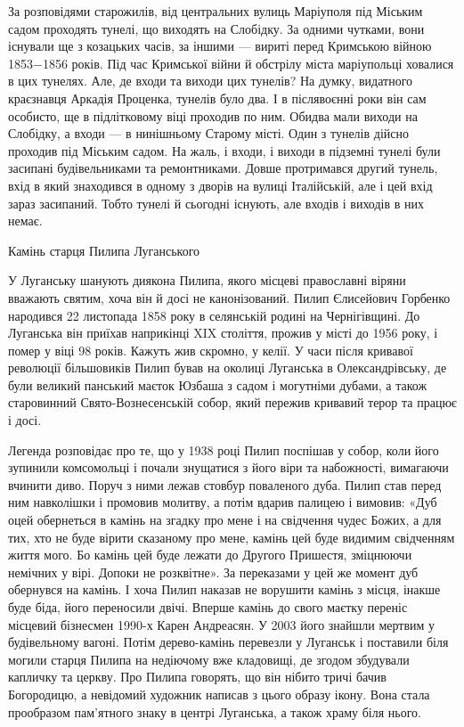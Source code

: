 За розповідями старожилів, від центральних вулиць Маріуполя під Міським садом
проходять тунелі, що виходять на Слобідку. За одними чутками, вони існували ще
з козацьких часів, за іншими — вириті перед Кримською війною 1853−1856 років.
Під час Кримської війни й обстрілу міста маріупольці ховалися в цих тунелях.
Але, де входи та виходи цих тунелів? На думку, видатного краєзнавця Аркадія
Проценка, тунелів було два. І в післявоєнні роки він сам особисто, ще в
підлітковому віці проходив по ним. Обидва мали виходи на Слобідку, а входи — в
нинішньому Старому місті. Один з тунелів дійсно проходив під Міським садом. На
жаль, і входи, і виходи в підземні тунелі були засипані будівельниками та
ремонтниками. Довше протримався другий тунель, вхід в який знаходився в одному
з дворів на вулиці Італійській, але і цей вхід зараз засипаний. Тобто тунелі й
сьогодні існують, але входів і виходів в них немає.

Камінь старця Пилипа Луганського

У Луганську шанують диякона Пилипа, якого місцеві православні віряни вважають
святим, хоча він й досі не канонізований. Пилип Єлисейович Горбенко народився
22 листопада 1858 року в селянській родині на Чернігівщині. До Луганська він
приїхав наприкінці XIX століття, прожив у місті до 1956 року, і помер у віці 98
років. Кажуть жив скромно, у келії. У часи після кривавої революції більшовиків
Пилип бував на околиці Луганська в Олександрівську, де були великий панський
маєток Юзбаша з садом і могутніми дубами, а також старовинний
Свято-Вознесенській собор, який пережив кривавий терор та працює і досі.

Легенда розповідає про те, що у 1938 році Пилип поспішав у собор, коли його
зупинили комсомольці і почали знущатися з його віри та набожності, вимагаючи
вчинити диво. Поруч з ними лежав стовбур поваленого дуба. Пилип став перед ним
навколішки і промовив молитву, а потім вдарив палицею і вимовив: «Дуб оцей
обернеться в камінь на згадку про мене і на свідчення чудес Божих, а для тих,
хто не буде вірити сказаному про мене, камінь цей буде видимим свідченням життя
мого. Бо камінь цей буде лежати до Другого Пришестя, зміцнюючи немічних у вірі.
Допоки не розквітне». За переказами у цей же момент дуб обернувся на камінь. І
хоча Пилип наказав не ворушити камінь з місця, інакше буде біда, його
переносили двічі. Вперше камінь до свого маєтку переніс місцевий бізнесмен
1990-х Карен Андреасян. У 2003 його знайшли мертвим у будівельному вагоні.
Потім дерево-камінь перевезли у Луганськ і поставили біля могили старця Пилипа
на недіючому вже кладовищі, де згодом збудували капличку та церкву. Про Пилипа
говорять, що він нібито тричі бачив Богородицю, а невідомий художник написав з
цього образу ікону. Вона стала прообразом пам'ятного знаку в центрі Луганська,
а також храму біля нього.

